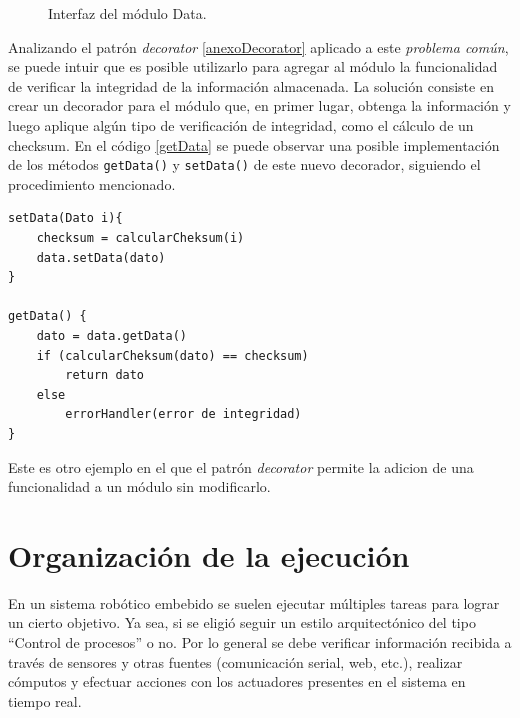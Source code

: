 \begin{figure}[H]
\caption{Interfaz del módulo Data.}
\label{dataInter}
\begin{center}
\end{center}
\end{figure}

Analizando el patrón \textit{decorator} \ref{anexoDecorator} aplicado a este \textit{problema común}, se puede intuir que es posible utilizarlo para agregar al módulo \Data la funcionalidad de verificar la integridad de la información almacenada. La solución consiste en crear un decorador para el módulo \Data que, en primer lugar, obtenga la información y luego aplique algún tipo de verificación de integridad, como el cálculo de un \gls{checksum}. En el código \ref{getData} se puede observar una posible implementación de los métodos \verb|getData()| y \verb|setData()| de este nuevo decorador, siguiendo el procedimiento mencionado.

\begin{lstlisting}[caption=Implementación de los métodos getData y setData del decorador que se encarga de verificar la integridad de la información almacenada en el módulo \Data.,label={getData}]
setData(Dato i){
    checksum = calcularCheksum(i)
    data.setData(dato)
}

getData() {
    dato = data.getData()
    if (calcularCheksum(dato) == checksum)
        return dato
    else
        errorHandler(error de integridad)
}
\end{lstlisting}

Este es otro ejemplo en el que el patrón \textit{decorator} permite la adicion de una funcionalidad a un módulo sin modificarlo.


\section{Organización de la ejecución}
\label{orgEjecucion}

En un sistema robótico embebido se suelen ejecutar múltiples tareas para lograr un cierto objetivo. Ya sea, si se eligió seguir un estilo arquitectónico del tipo ``Control de procesos'' o no. Por lo general se debe verificar información recibida a través de sensores y otras fuentes (comunicación serial, web, etc.), realizar cómputos y efectuar acciones con los actuadores presentes en el sistema en tiempo real.

